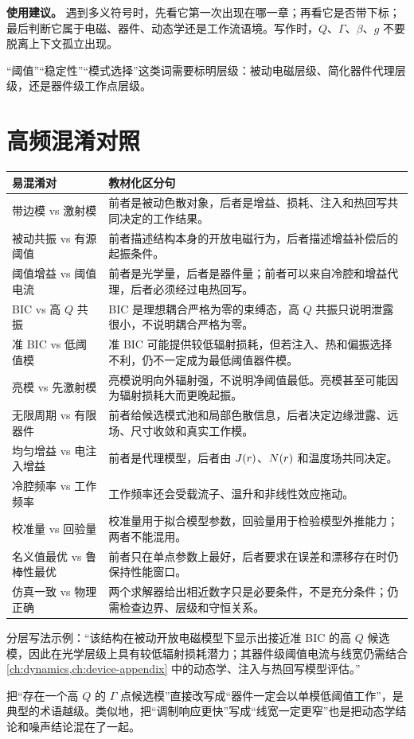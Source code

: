 \textbf{使用建议。} 遇到多义符号时，先看它第一次出现在哪一章；再看它是否带下标；最后判断它属于电磁、器件、动态学还是工作流语境。写作时，$Q$、$\Gamma$、$\beta$、$g$ 不要脱离上下文孤立出现。

“阈值”“稳定性”“模式选择”这类词需要标明层级：被动电磁层级、简化器件代理层级，还是器件级工作点层级。

\section{高频混淆对照}
\begin{longtable}{@{}p{}p{}@{}}
\toprule
易混淆对 & 教材化区分句 \\
\midrule
\endhead
带边模 vs 激射模 & 前者是被动色散对象，后者是增益、损耗、注入和热回写共同决定的工作结果。 \\
被动共振 vs 有源阈值 & 前者描述结构本身的开放电磁行为，后者描述增益补偿后的起振条件。 \\
阈值增益 vs 阈值电流 & 前者是光学量，后者是器件量；前者可以来自冷腔和增益代理，后者必须经过电热回写。 \\
BIC vs 高 $Q$ 共振 & BIC 是理想耦合严格为零的束缚态，高 $Q$ 共振只说明泄露很小，不说明耦合严格为零。 \\
准 BIC vs 低阈值模 & 准 BIC 可能提供较低辐射损耗，但若注入、热和偏振选择不利，仍不一定成为最低阈值器件模。 \\
亮模 vs 先激射模 & 亮模说明向外辐射强，不说明净阈值最低。亮模甚至可能因为辐射损耗大而更晚起振。 \\
无限周期 vs 有限器件 & 前者给候选模式池和局部色散信息，后者决定边缘泄露、远场、尺寸收敛和真实工作模。 \\
均匀增益 vs 电注入增益 & 前者是代理模型，后者由 $J(r)$、$N(r)$ 和温度场共同决定。 \\
冷腔频率 vs 工作频率 & 工作频率还会受载流子、温升和非线性效应拖动。 \\
校准量 vs 回验量 & 校准量用于拟合模型参数，回验量用于检验模型外推能力；两者不能混用。 \\
名义值最优 vs 鲁棒性最优 & 前者只在单点参数上最好，后者要求在误差和漂移存在时仍保持性能窗口。 \\
仿真一致 vs 物理正确 & 两个求解器给出相近数字只是必要条件，不是充分条件；仍需检查边界、层级和守恒关系。 \\
\bottomrule
\end{longtable}

分层写法示例：“该结构在被动开放电磁模型下显示出接近准 BIC 的高 $Q$ 候选模，因此在光学层级上具有较低辐射损耗潜力；其器件级阈值电流与线宽仍需结合 \cref{ch:dynamics,ch:device-appendix} 中的动态学、注入与热回写模型评估。”

\begin{PitfallBox}
把“存在一个高 $Q$ 的 $\Gamma$ 点候选模”直接改写成“器件一定会以单模低阈值工作”，是典型的术语越级。类似地，把“调制响应更快”写成“线宽一定更窄”也是把动态学结论和噪声结论混在了一起。
\end{PitfallBox}

